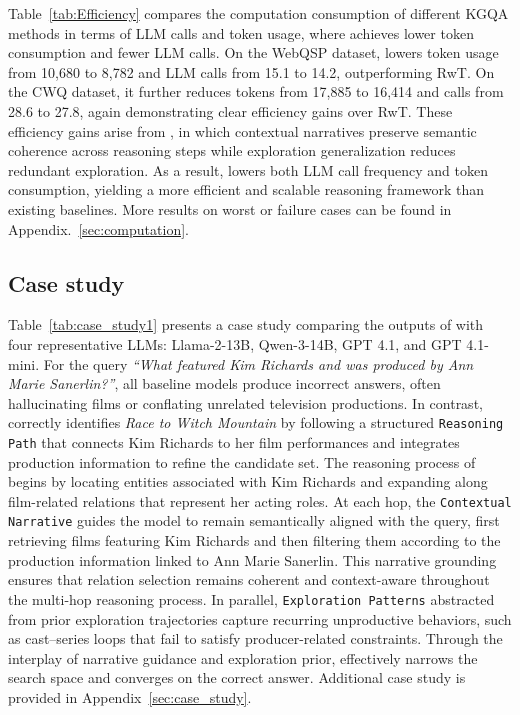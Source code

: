 Table~\ref{tab:Efficiency} compares the computation consumption of different KGQA methods in terms of LLM calls and token usage, where \method{} achieves lower token consumption and fewer LLM calls. On the WebQSP dataset, \method{} lowers token usage from 10,680 to 8,782 and LLM calls from 15.1 to 14.2, outperforming RwT. On the CWQ dataset, it further reduces tokens from 17,885 to 16,414 and calls from 28.6 to 27.8, again demonstrating clear efficiency gains over RwT. These efficiency gains arise from \method{}, in which contextual narratives preserve semantic coherence across reasoning steps while exploration generalization reduces redundant exploration. As a result, \method{} lowers both LLM call frequency and token consumption, yielding a more efficient and scalable reasoning framework than existing baselines. More results on worst or failure cases can be found in Appendix.~\ref{sec:computation}. 




\subsection{Case study}

Table~\ref{tab:case_study1} presents a case study comparing the outputs of \method{} with four representative LLMs: Llama-2-13B, Qwen-3-14B, GPT 4.1, and GPT 4.1-mini. For the query \textit{“What featured Kim Richards and was produced by Ann Marie Sanerlin?”}, all baseline models produce incorrect answers, often hallucinating films or conflating unrelated television productions. In contrast, \method{} correctly identifies \textit{Race to Witch Mountain} by following a structured \texttt{Reasoning Path} that connects Kim Richards to her film performances and integrates production information to refine the candidate set. The reasoning process of \method{} begins by locating entities associated with Kim Richards and expanding along film-related relations that represent her acting roles. At each hop, the \texttt{Contextual Narrative} guides the model to remain semantically aligned with the query, first retrieving films featuring Kim Richards and then filtering them according to the production information linked to Ann Marie Sanerlin. This narrative grounding ensures that relation selection remains coherent and context-aware throughout the multi-hop reasoning process. In parallel, \texttt{Exploration Patterns} abstracted from prior exploration trajectories capture recurring unproductive behaviors, such as cast–series loops that fail to satisfy producer-related constraints. Through the interplay of narrative guidance and exploration prior, \method{} effectively narrows the search space and converges on the correct answer. Additional case study is provided in Appendix~\ref{sec:case_study}.





